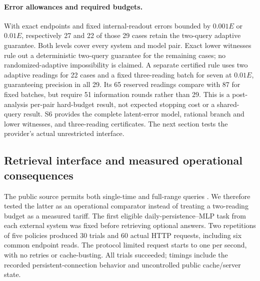 \paragraph{Error allowances and required budgets.}
\label{sec:stored-error-sensitivity:s15}
With exact endpoints and fixed internal-readout errors bounded by
$0.001E$ or $0.01E$, respectively 27 and 22 of those 29 cases retain the
two-query adaptive guarantee. Both levels cover every system and model
pair. Exact lower witnesses rule out a deterministic two-query guarantee
for the remaining cases; no randomized-adaptive impossibility is claimed.
A separate certified rule uses two adaptive readings for 22 cases and a
fixed three-reading batch for seven at $0.01E$, guaranteeing precision in
all 29. Its 65 reserved readings compare with 87 for fixed batches, but
require 51 information rounds rather than 29. This is a post-analysis
per-pair hard-budget result, not expected stopping cost or a shared-query
result. S6 provides the complete latent-error model, rational branch and
lower witnesses, and three-reading certificates. The next section tests
the provider's actual unrestricted interface.

\subsection{Retrieval interface and measured operational consequences}
\label{sec:actual-api}
The public source permits both single-time and full-range queries
\citep{hpmapi,hpmcode}. We therefore tested the latter as an operational
comparator instead of treating a two-reading budget as a measured tariff.
The first eligible daily-persistence--MLP task from each external system
was fixed before retrieving optional answers. Two repetitions of five
policies produced 30 trials and 60 actual HTTP requests, including six
common endpoint reads. The protocol limited request starts to one per
second, with no retries or cache-busting. All trials succeeded; timings
include the recorded persistent-connection behavior and uncontrolled
public cache/server state.

